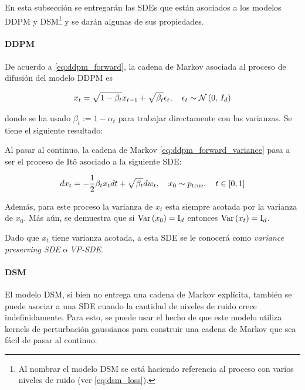 En esta subsección se entregarán las SDEs que están asociados a los modelos DDPM y DSM\footnote{Al nombrar el modelo DSM se está haciendo referencia al proceso con varios niveles de ruido (ver \eqref{eq:dsm_loss}).} y se darán algunas de sus propiedades.

\paragraph{DDPM}

De acuerdo a \eqref{eq:ddpm_forward}, la cadena de Markov asociada al proceso de difusión del modelo DDPM es

\begin{equation}
    \label{eq:ddpm_forward_variance}
    x_t = \sqrt{1-\beta_t} x_{t-1} + \sqrt{\beta_t} \epsilon_t,\quad \epsilon_t\sim\mathcal{N}\left(0,\,I_d\right)
\end{equation}

donde se ha usado $\beta_t:=1-\alpha_t$ para trabajar directamente con las varianzas. Se tiene el siguiente resultado:

\begin{prop}
    Al pasar al continuo, la cadena de Markov \eqref{eq:ddpm_forward_variance} pasa a ser el proceso de Itô asociado a la siguiente SDE:

    \begin{equation}
        \label{eq:ddpm_sde}
        dx_t = -\frac{1}{2}\beta_t x_t dt + \sqrt{\beta_t}dw_t, \quad x_0\sim p_{\operatorname{true}},\quad t\in[0,1]
    \end{equation}

    Además, para este proceso la varianza de $x_t$ esta siempre acotada por la varianza de $x_0$. Más aún, se demuestra que si $\operatorname{Var}\left(x_0\right)=\operatorname{I}_{d}$ entonces $\operatorname{Var}\left(x_t\right)=\operatorname{I}_{d}$.
\end{prop}

Dado que $x_t$ tiene varianza acotada, a esta SDE se le conocerá como \textit{variance preserving SDE} o \textit{VP-SDE}.

\paragraph{DSM}

El modelo DSM, si bien no entrega una cadena de Markov explícita, también se puede asociar a una SDE cuando la cantidad de niveles de ruido crece indefinidamente. Para esto, se puede usar el hecho de que este modelo utiliza kernels de perturbación gaussianos para construir una cadena de Markov que sea fácil de pasar al continuo.

